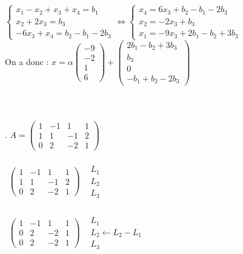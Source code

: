 \documentclass[11pt, fleqn]{report}
\begin{document}
$ \begin{cases}
	x_1-x_2+x_3+x_4 = b_1 \\
	x_2+2x_3 = b_3 \\
	-6x_3+x_4 = b_2-b_1-2b_3
\end{cases}
\Leftrightarrow
\begin{cases}
	x_4 = 6x_3 + b_2-b_1-2b_3\\
	x_2 = -2x_3 + b_3\\
	x_1 = -9x_3 +2b_1-b_2+3b_3
\end{cases}
$ 
\\
On a donc : $ x = \alpha \left(\begin{array}{c} -9\\-2\\1\\6 \end{array}\right) + \left(\begin{array}{l} 2b_1-b_2+3b_3 \\ b_3 \\
0 \\ -b_1 + b_2 - 2b_3 \end{array} \right) $
\\
\\
\\
\\ 
. $ A=\left(\begin{array}{cccc}1 & -1 & 1 & 1 \\1 & 1 & -1 & 2 \\0 & 2 & -2 & 1\end{array}\right) $
\\
\\
$ \begin{array}{cc}
	\left(\begin{array}{cccc}
		1 & -1 & 1 & 1 \\
		1 & 1 & -1 & 2 \\
		0 & 2 & -2 & 1
	\end{array}\right)
	&
	\begin{array}{l}
		L_1 \\
		L_2 \\
		L_3
	\end{array}	
\end{array} $
\\
\\
$ \begin{array}{cc}
	\left(\begin{array}{cccc}
		1 & -1 & 1 & 1 \\
		0 & 2 & -2 & 1 \\
		0 & 2 & -2 & 1\end{array}\right)
	&
	\begin{array}{l}
		L_1 \\
		L_2 \leftarrow L_2-L_1 \\
		L_3
	\end{array}	
\end{array} $		
\end{document}
